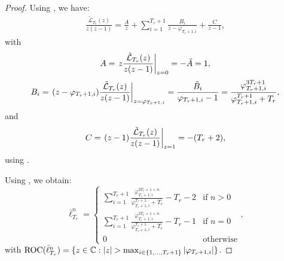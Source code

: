 \documentclass{article}
\begin{document}
\begin{proof}
      Using , we have:
      \begin{align}
        \frac{\tilde{\mathcal{L}}_{T_r}(z)}{z(z-1)} =  \frac{A}{z} + \sum_{i=1}^{T_r + 1} \frac{B_i}{z - \varphi_{T_r + 1, i}} + \frac{C}{z-1},
      \end{align}
      with 
      \begin{equation}
        A = \left.z\frac{\tilde{\mathcal{L}}_{T_r}(z)}{z(z-1)}\right|_{z = 0} = - \tilde{A} = 1,
      \end{equation}
      \begin{equation}
        B_i = \left.(z - \varphi_{T_r + 1, i})\frac{\tilde{\mathcal{L}}_{T_r}(z)}{z(z-1)}\right|_{z = \varphi_{T_r + 1, i}} = \frac{\tilde{B}_i}{\varphi_{T_r + 1, i}-1} = \frac{\varphi_{T_r + 1, i}^{3T_r + 1}}
        {\varphi_{T_r + 1, i}^{T_r + 1} + T_r},
      \end{equation}
      and
      \begin{align}
        C = \left.(z - 1)\frac{\tilde{\mathcal{L}}_{T_r}(z)}{z(z-1)}\right|_{z = 1} = -(T_r + 2),
      \end{align}
      using .

      Using , we obtain:
      \begin{equation}
        \bar{\ell}_{T_r}^{n} = 
        \left\{
          \begin{array}{ll}
            \sum_{i=1}^{T_r + 1} \frac{\varphi_{T_r + 1, i}^{3T_r + 1 + n}}
            {\varphi_{T_r + 1, i}^{T_r + 1} + T_r} - T_r - 2 & \mbox{if } n > 0 \\
            \sum_{i=1}^{T_r + 1} \frac{\varphi_{T_r + 1, i}^{3T_r + 1 + n}}
            {\varphi_{T_r + 1, i}^{T_r + 1} + T_r} -T_r -1& \mbox{if } n = 0 \\
            0 & \mbox{otherwise}
          \end{array}
        \right.,
      \end{equation}
      with $\textnormal{ROC}(\bar{\ell}_{T_r}^n) = \{z \in \mathbb C: |z| > \max_{i \in \{1, \dots, T_r + 1\}} |\varphi_{T_r + 1, i}|\}$.

    \end{proof}
\end{document}

